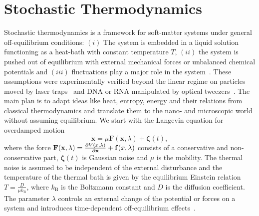 \section{Stochastic Thermodynamics}
\label{sec:StochTherm}
Stochastic thermodynamics is a framework for soft-matter systems under general off-equilibrium conditions: $(i)$ The system is embedded in a liquid solution functioning as a heat-bath with constant temperature $T$, $(ii)$ the system is pushed out of equilibrium with external mechanical forces or unbalanced chemical potentials and $(iii)$ fluctuations play a major role in the system~\cite{seifert2008stochastic}. These assumptions were experimentally verified beyond the linear regime on  particles moved by laser traps~\cite{blickle2006thermodynamics} and DNA or RNA manipulated by optical tweezers~\cite{liphardt2002equilibrium}. 
The main plan is to adapt ideas like heat, entropy, energy and their relations from classical thermodynamics and translate them to the nano- and microscopic world without assuming equilibrium. We start with the Langevin equation for overdamped motion 
\begin{equation}
 \mathbf{\dot x} = \mu \mathbf{ F }( \mathbf{x},\lambda) + \boldsymbol{ \zeta }(t) ,
\label{eq:LangevinOver}
 \end{equation}
where the force $\mathbf{F}(\mathbf{x},\lambda) = \pdv{V(x,\lambda)}{\mathbf{x}} + \mathbf{f}(x,\lambda)$ consists of a conservative and non-conservative part, $\boldsymbol{\zeta}(t)$  is Gaussian noise and $\mu$ is the mobility. The thermal noise is assumed to be independent of the external disturbance  and the temperature of the thermal bath is given by the equilibrium Einstein relation $T = \frac{D}{\mu k_{\mathrm{B}}} $, where $k_{\mathrm{B}}$ is the Boltzmann constant and $D$ is the diffusion coefficient. The parameter $\lambda$ controls an external change of the potential or forces on a system and introduces time-dependent off-equilibrium effects~\cite{seifert2008stochastic}.  



